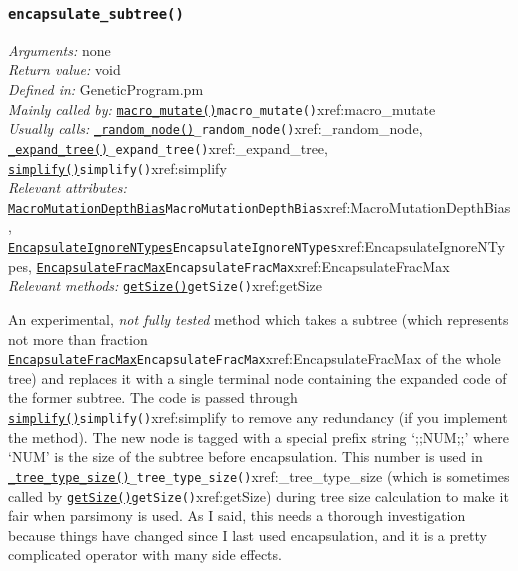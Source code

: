 \documentclass[a4paper]{article}
\begin{document}
\subsubsection{\texttt{encapsulate\_subtree()}}\label{xref:encapsulate_subtree}
\begin{flushleft}
\textit{Arguments:} none\\
\textit{Return value:} void\\
\textit{Defined in:} GeneticProgram.pm\\
\textit{Mainly called by:} \hyperref[no]{\texttt{macro\_mutate()}}{\texttt{macro\_mutate()}}{xref:macro_mutate}\\
\textit{Usually calls:} \hyperref[no]{\texttt{\_random\_node()}}{\texttt{\_random\_node()}}{xref:_random_node}, \hyperref[no]{\texttt{\_expand\_tree()}}{\texttt{\_expand\_tree()}}{xref:_expand_tree}, \hyperref[no]{\texttt{simplify()}}{\texttt{simplify()}}{xref:simplify}\\
\textit{Relevant attributes:} \hyperref[no]{\texttt{MacroMutationDepthBias}}{\texttt{MacroMutationDepthBias}}{xref:MacroMutationDepthBias}, \hyperref[no]{\texttt{EncapsulateIgnoreNTypes}}{\texttt{EncapsulateIgnoreNTypes}}{xref:EncapsulateIgnoreNTypes}, \hyperref[no]{\texttt{EncapsulateFracMax}}{\texttt{EncapsulateFracMax}}{xref:EncapsulateFracMax}\\
\textit{Relevant methods:} \hyperref[no]{\texttt{getSize()}}{\texttt{getSize()}}{xref:getSize}
\end{flushleft}

An experimental, \textit{not fully tested} method which takes a
subtree (which represents not more than fraction
\hyperref[no]{\texttt{EncapsulateFracMax}}{\texttt{EncapsulateFracMax}}{xref:EncapsulateFracMax} of the whole tree) and replaces it with a
single terminal node containing the expanded code of the former
subtree.  The code is passed through \hyperref[no]{\texttt{simplify()}}{\texttt{simplify()}}{xref:simplify} to remove any
redundancy (if you implement the method).  The new node is tagged with
a special prefix string `;;NUM;;' where `NUM' is the size of the
subtree before encapsulation.  This number is used in
\hyperref[no]{\texttt{\_tree\_type\_size()}}{\texttt{\_tree\_type\_size()}}{xref:_tree_type_size} (which is sometimes called by
\hyperref[no]{\texttt{getSize()}}{\texttt{getSize()}}{xref:getSize}) during tree size calculation to make it fair when
parsimony is used.  As I said, this needs a thorough investigation
because things have changed since I last used encapsulation, and it is
a pretty complicated operator with many side effects.
\end{document}
